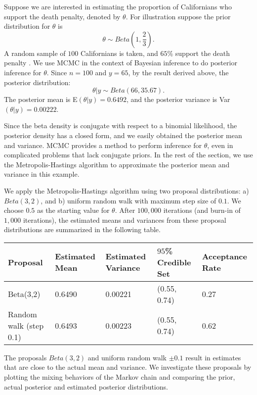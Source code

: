 \documentclass[12pt,openany]{article}
\theoremstyle{remark} %
\theoremstyle{definition} %
\begin{document}
Suppose we are interested in estimating the proportion of Californians who support the death penalty, denoted by $\theta$. For illustration suppose the prior distribution for $\theta$ is 
\[
	\theta \sim Beta(1,\frac{2}{3}).
\]
A random sample of $100$ Californians is taken, and $65$\% support the death penalty \citep{bayesian}. We use MCMC in the context of Bayesian inference to do posterior inference for $\theta$. Since $n=100$ and $y=65$, by the  result derived above, the posterior distribution: 
\[
	\theta|y \sim Beta(66,35.67).
\]
The posterior mean is E$(\theta|y) = 0.6492$, and the posterior variance is Var$(\theta|y) = 0.00222$.

Since the beta density is conjugate with respect to a binomial likelihood, the posterior density has a closed form, and we easily obtained the posterior mean and variance. MCMC provides a method to perform inference for $\theta$, even in complicated problems that lack conjugate priors. In the rest of the section, we use the Metropolis-Hastings algorithm to approximate the posterior mean and variance in this example.

We apply the Metropolis-Hastings algorithm using two proposal distributions: a) $Beta(3,2)$, and b) uniform random walk with maximum step size of $0.1$. We choose $0.5$ as the starting value for $\theta$. After $100,000$ iterations (and burn-in of $1,000$ iterations), the estimated means and variances from these proposal distributions are summarized in the following table. 

\bigskip
\begin{minipage}{\linewidth}
\centering
{} \label{tab:summary} 
\begin{tabular}{C{1.10in} *2{C{.70in}} C{1.10in} C{0.70in} }\toprule[1.5pt]
Proposal & Estimated Mean & Estimated Variance & $95$\% Credible Set & Acceptance Rate\\
\midrule
Beta(3,2) & 0.6490 & 0.00221 & (0.55, 0.74) & 0.27\\
Random walk (step 0.1) & 0.6493 & 0.00223 & (0.55, 0.74) & 0.62\\
\bottomrule[1.25pt]
\end {tabular}\par
\bigskip
\end{minipage}

\bigskip

The proposals $Beta(3,2)$ and uniform random walk $\pm 0.1$ result in estimates that are close to the actual mean and variance. We investigate these proposals by plotting the mixing behaviors of the Markov chain and comparing the prior, actual posterior and estimated posterior distributions.
\end{document}

